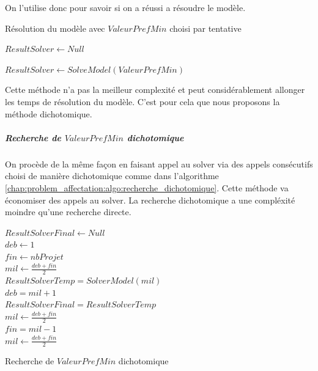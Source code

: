 \documentclass[final,poster]{polytech/polytech}
\begin{document}
On l'utilise donc pour savoir si on a réussi a résoudre le modèle.
\begin{algorithm}
\caption{\label{chap:problem_affectation:algo:recherche_tatonnement}Résolution du modèle avec $ValeurPrefMin$ choisi par tentative}

$ResultSolver \gets Null$ \\

{

	$ResultSolver \gets SolveModel(ValeurPrefMin)$ \\



	{
		\Break

	}
}
\end{algorithm}

Cette méthode n'a pas la meilleur complexité et peut considérablement allonger les temps de résolution du modèle. C'est pour cela que nous proposons la méthode dichotomique.

\subparagraph{Recherche de $ValeurPrefMin$ dichotomique}

On procède de la même façon en faisant appel au solver via des appels consécutifs choisi de manière dichotomique comme dans l'algorithme \autoref{chap:problem_affectation:algo:recherche_dichotomique}.
Cette méthode va économiser des appels au solver. 
La recherche dichotomique a une compléxité moindre qu'une recherche directe.

\begin{algorithm}
$ResultSolverFinal \gets Null$ \\
$deb \gets 1$ \\
$fin \gets nbProjet$ \\
$mil \gets \frac{deb+fin}{2}$ \\
{
	$ResultSolverTemp=SolverModel(mil)$\\
{
$deb=mil+1$\\
$ResultSolverFinal=ResultSolverTemp$\\
$mil \gets \frac{deb+fin}{2}$ \\
}
\Else
{
	$fin=mil-1$\\
	$mil \gets \frac{deb+fin}{2}$ \\
}
}

\caption{\label{chap:problem_affectation:algo:recherche_dichotomique}Recherche de $ValeurPrefMin$ dichotomique}
\end{algorithm}
\end{document}
